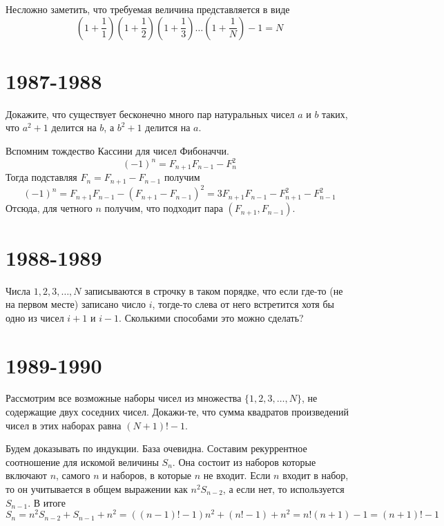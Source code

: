 \documentclass[11pt, a4paper]{template}
\begin{document}
\begin{solution}
Несложно заметить, что требуемая величина представляется в виде
$$
\left(1 + \frac{1}{1}\right)\left(1 + \frac{1}{2}\right)\left(1 + \frac{1}{3}\right)\dots \left(1 + \frac{1}{N}\right) - 1 = N
$$
\end{solution}

\chapter{1987-1988}

\begin{exercise}
Докажите, что существует бесконечно много пар натуральных чисел $a$ и $b$ таких, что $a^{2} + 1$ делится на $b$, а $b^{2} + 1$ делится на $a$.
\end{exercise}

\begin{solution}
Вспомним тождество Кассини для чисел Фибоначчи.
$$
(-1)^{n} = F_{n+1}F_{n-1} - F_{n}^{2}
$$
Тогда подставляя $F_{n} = F_{n+1} - F_{n-1}$ получим
$$
(-1)^{n} = F_{n+1}F_{n-1} - (F_{n+1} - F_{n-1})^{2} = 3F_{n+1}F_{n-1}-F_{n+1}^{2} - F_{n-1}^{2}
$$
Отсюда, для четного $n$ получим, что подходит пара $(F_{n+1}, F_{n-1})$. 
\end{solution}

\chapter{1988-1989}

\begin{exercise}
Числа $1, 2, 3, \dots, N$ записываются в строчку в таком порядке, что если где-то (не на первом месте) записано число $i$, тогде-то слева от него встретится хотя бы одно из чисел $i+1$ и $i-1$. Сколькими способами это можно сделать?
\end{exercise}

\chapter{1989-1990}

\begin{exercise}
Рассмотрим все возможные наборы чисел из множества $\{1, 2, 3, \dots, N\}$, не содержащие двух соседних чисел. Докажи-те, что сумма квадратов произведений чисел в этих наборах равна $(N+1)!-1$.
\end{exercise}

\begin{solution}
Будем доказывать по индукции. База очевидна. Составим рекуррентное соотношение для искомой величины $S_{n}$. Она состоит из наборов которые включают $n$, самого $n$ и наборов, в которые $n$ не входит. Если $n$ входит в набор, то он учитывается в общем выражении как $n^{2}S_{n-2}$, а если нет, то используется $S_{n-1}$. В итоге
$$
S_{n} = n^{2}S_{n-2}+S_{n-1}+n^{2} = ((n-1)! - 1)n^{2} + (n! - 1) + n^{2} = n!(n + 1) - 1 = (n + 1)! - 1
$$  
\end{solution}
\end{document}
